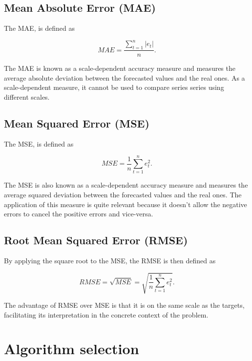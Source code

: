 \subsection{Mean Absolute Error (MAE)}

The \ac{MAE}, is defined as

\begin{equation}
     MAE =\frac {\sum_{t=1}^n|e_t|}{n}.
\label{mae}
\end{equation}

The \ac{MAE} is known as a scale-dependent accuracy measure and measures the average absolute deviation between the forecasted values and the real ones. As a scale-dependent measure, it cannot be used to compare series series using different scales.


\subsection{Mean Squared Error (MSE)}

The \ac{MSE}, is defined as

\begin{equation}
     MSE =\frac {1}{n}\sum_{t=1}^ne_t^2.
\label{mse}
\end{equation}

The \ac{MSE} is also known as a scale-dependent accuracy measure and measures the average squared deviation between the forecasted values and the real ones. The application of this measure is quite relevant because it doesn't allow the negative errors to cancel the positive errors and vice-versa. 

\subsection{Root Mean Squared Error (RMSE)}

By applying the square root to the \ac{MSE}, the \ac{RMSE} is then defined as

\begin{equation}
     RMSE =\sqrt{MSE} = \sqrt{\frac {1}{n}\sum_{t=1}^ne_t^2}.
\label{rmse}
\end{equation}

The advantage of \ac{RMSE} over \ac{MSE} is that it is on the same scale as the targets, facilitating its interpretation in the concrete context of the problem. 

\section{Algorithm selection} \label{chap5:framework}

